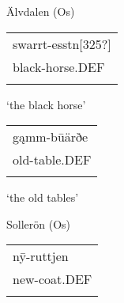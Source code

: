 \begin{listWWNumileveli}
\item 

\begin{styleExample}
Älvdalen (Os)

\end{styleExample}

\end{listWWNumileveli}

\begin{listWWNumlxviileveli}
\item 

\end{listWWNumlxviileveli}

\begin{tabular}{l}
\lsptoprule
swarrt-esstn[325?]\\
black-horse.DEF\\
\lspbottomrule
\end{tabular}

\begin{styleTranslation}
‘the black horse’

\end{styleTranslation}

\begin{tabular}{l}
\lsptoprule
gąmm-b\=uärðe\\
old-table.DEF\\
\lspbottomrule
\end{tabular}

\begin{styleTranslation}
‘the old tables’

\end{styleTranslation}


\begin{listWWNumileveli}
\item 

\begin{styleExample}
Sollerön (Os)

\end{styleExample}

\end{listWWNumileveli}

\begin{tabular}{l}
\lsptoprule
n\={y}-ruttjen\\
new-coat.DEF\\
\lspbottomrule
\end{tabular}

